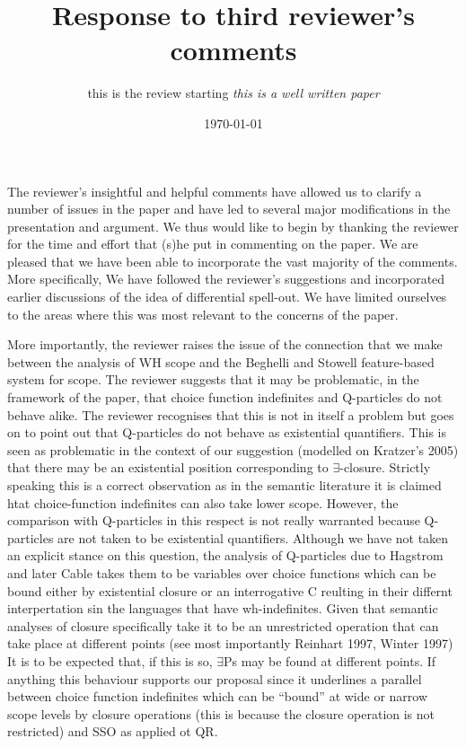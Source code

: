 \documentclass[11pt]{article}
\begin{document}
\title{Response to third reviewer's comments}
\author{this is the review starting \textit{this is a well written paper}}
\date{\today}

\maketitle


The reviewer's insightful and helpful comments have allowed us to clarify a number of issues in the paper and have led to several major modifications in the presentation and argument. We thus would like to begin by thanking the reviewer for the time and effort that (s)he put in commenting on the paper. We are pleased that we have been able to incorporate the vast majority of the comments.  More specifically, We have followed the reviewer's suggestions and incorporated earlier discussions of the idea of differential spell-out.  We have limited ourselves to the areas where this was most relevant to the concerns of the paper.

More importantly, the reviewer raises the issue of the connection that we make between the analysis of WH scope and the Beghelli and Stowell feature-based system for scope.  The reviewer suggests that it may be problematic, in the framework of the paper, that choice function  indefinites and Q-particles do not behave alike.  The reviewer recognises that this is not in itself a problem but goes on to point out that  Q-particles do not behave as existential quantifiers.  This is seen as problematic in the context of our suggestion (modelled on Kratzer's 2005) that there may be an existential position corresponding to $\exists$-closure.    Strictly speaking this is a correct observation as in the semantic literature it is claimed htat choice-function indefinites can also take lower scope.  However, the comparison with Q-particles in this respect is not really warranted because Q-particles are not taken to be existential quantifiers.  Although we have not taken an explicit stance on this question, the analysis of Q-particles due to Hagstrom and later Cable takes them to be variables over choice functions which can be bound either by existential closure or an interrogative C reulting in their differnt interpertation sin the languages that have wh-indefinites. Given that semantic analyses of closure specifically take it to be an unrestricted operation that can take place at different points (see most importantly Reinhart 1997, Winter 1997)  It is to be expected that, if this is so, $\exists$Ps may be found at different points.   If anything this behaviour supports our proposal since it underlines a parallel between choice function indefinites which can be ``bound'' at wide or narrow scope levels by closure operations (this is because the closure operation is not restricted) and SSO as applied ot QR.
\end{document}
